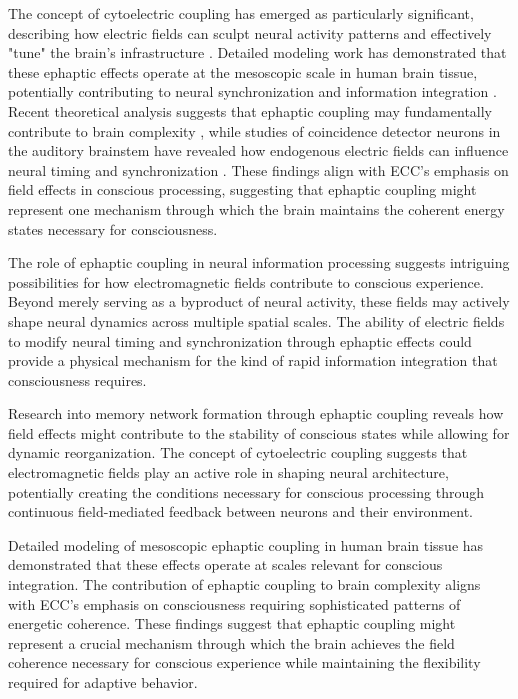 \begin{refsection}
The concept of cytoelectric coupling has emerged as particularly significant, describing how electric fields can sculpt neural activity patterns and effectively "tune" the brain's infrastructure \cite{Pinotsis2023Cytoelectric}. Detailed modeling work has demonstrated that these ephaptic effects operate at the mesoscopic scale in human brain tissue, potentially contributing to neural synchronization and information integration \cite{Reimann2020Modeling}. Recent theoretical analysis suggests that ephaptic coupling may fundamentally contribute to brain complexity \cite{Cunha2024Ephapticity}, while studies of coincidence detector neurons in the auditory brainstem have revealed how endogenous electric fields can influence neural timing and synchronization \cite{Goldwyn2016Neuronal}. These findings align with ECC's emphasis on field effects in conscious processing, suggesting that ephaptic coupling might represent one mechanism through which the brain maintains the coherent energy states necessary for consciousness.

The role of ephaptic coupling in neural information processing suggests intriguing possibilities for how electromagnetic fields contribute to conscious experience. Beyond merely serving as a byproduct of neural activity, these fields may actively shape neural dynamics across multiple spatial scales. The ability of electric fields to modify neural timing and synchronization through ephaptic effects \cite{Goldwyn2016Neuronal} could provide a physical mechanism for the kind of rapid information integration that consciousness requires.

Research into memory network formation through ephaptic coupling \cite{Pinotsis2023Ephaptic} reveals how field effects might contribute to the stability of conscious states while allowing for dynamic reorganization. The concept of cytoelectric coupling \cite{Pinotsis2023Cytoelectric} suggests that electromagnetic fields play an active role in shaping neural architecture, potentially creating the conditions necessary for conscious processing through continuous field-mediated feedback between neurons and their environment.

Detailed modeling of mesoscopic ephaptic coupling in human brain tissue \cite{Reimann2020Modeling} has demonstrated that these effects operate at scales relevant for conscious integration. The contribution of ephaptic coupling to brain complexity \cite{Cunha2024Ephapticity} aligns with ECC's emphasis on consciousness requiring sophisticated patterns of energetic coherence. These findings suggest that ephaptic coupling might represent a crucial mechanism through which the brain achieves the field coherence necessary for conscious experience while maintaining the flexibility required for adaptive behavior.


\end{refsection}
